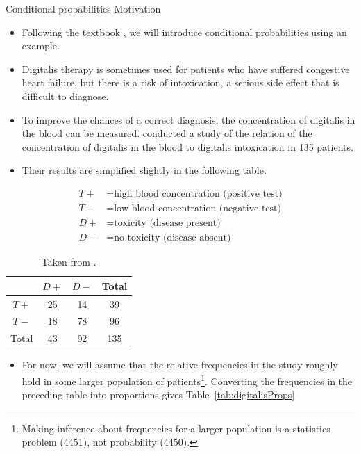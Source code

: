 \begin{frame}[allowframebreaks]{Conditional probabilities Motivation}
  \begin{itemize}
    \item Following the textbook \citep{rice07}, we will introduce conditional probabilities using an example.
  
    \item \alert{Digitalis therapy} \citep{rahimtoola04} is sometimes used for patients who have suffered congestive heart failure, but there is a risk of intoxication, a serious side effect that is difficult to diagnose.
    \item To improve the chances of a correct diagnosis, the concentration of digitalis in the blood can be measured. \citet{beller71} conducted a study of the relation of the concentration of digitalis in the blood to digitalis intoxication in 135 patients.
    \item Their results are simplified slightly in the following table.
  \end{itemize}
  
  \begin{align*}
    T+ &= \text{high blood concentration (positive test)}\\
    T- &= \text{low blood concentration (negative test)}\\
    D+ &= \text{toxicity (disease present)}\\
    D- &= \text{no toxicity (disease absent)}
  \end{align*}
  
  \begin{table}
    \centering
    \begin{tabular}{c|cc|c}
            & $D+$ & $D-$ & Total \\\hline
      $T+$  & 25   & 14   & 39 \\
      $T-$  & 18   & 78   & 96 \\\hline
      Total & 43   & 92   & 135 \\
    \end{tabular}
    \caption{\label{tab:digitalis}Taken from \citep[][Chapter~1]{rice07}.}
  \end{table}
  
  \begin{itemize}
    \item For now, we will assume that the relative frequencies in the study roughly hold in some larger population of patients\footnote{Making inference about frequencies for a larger population is a \alert{statistics} problem (4451), not probability (4450).}. Converting the frequencies in the preceding table into proportions gives Table~\ref{tab:digitalisProps}
  \end{itemize}
  

\end{frame}
